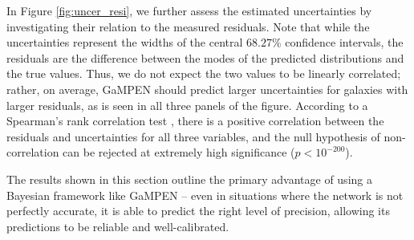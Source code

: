 \documentclass[twocolumn]{aastex63}
\newcommand\gampen{GaMPEN}
\begin{document}
\begin{CJK*}{UTF8}{gbsn}

In Figure \ref{fig:uncer_resi}, we further assess the estimated uncertainties by investigating their relation to the measured residuals. Note that while the uncertainties represent the widths of the central $68.27\%$ confidence intervals, the residuals are the difference between the modes of the predicted distributions and the true values. Thus, we do not expect the two values to be linearly correlated; rather, on average, \gampen{} should predict larger uncertainties for galaxies with larger residuals, as is seen in all three panels of the figure. 
According to a Spearman's rank correlation test \citep[see][for more details]{spearman}, there is a positive correlation between the residuals and uncertainties for all three variables, and the null hypothesis of non-correlation can be rejected at extremely high significance ($p < 10^{-200}$). 

 
The results shown in this section outline the primary advantage of using a Bayesian framework like \gampen{} -- even in situations where the network is not perfectly accurate, it is able to predict the right level of precision, allowing its predictions to be reliable and well-calibrated.


\end{CJK*}
\end{document}

